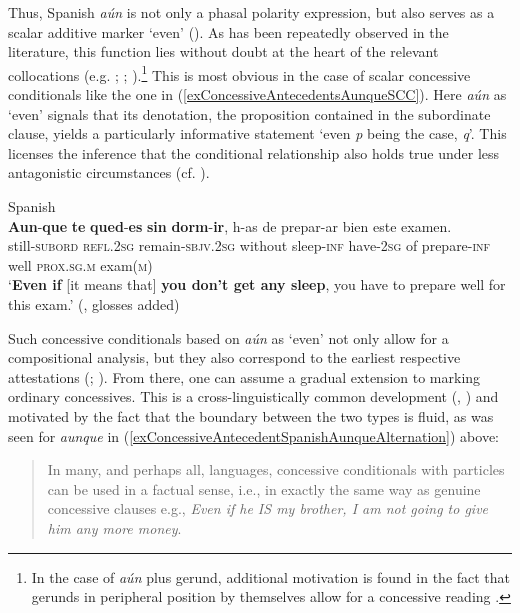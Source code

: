 Thus, Spanish \textit{aún} is not only a phasal polarity expression, but also serves as a scalar additive marker \lq even\rq{ }(). As has been repeatedly observed in the literature, this function lies without doubt at the heart of the relevant collocations (e.g. \cite{Elvira2005}; \cite{PerezSaldanyaVincent2014}; \cite{RAEGramatica}).\footnote{In the case of \textit{aún} plus gerund, additional motivation is found in the fact that gerunds in peripheral position by themselves allow for a concessive reading \parencite[§27.5g]{RAEGramatica}.} This is most obvious in the case of scalar concessive conditionals like the one in (\ref{exConcessiveAntecedentsAunqueSCC}). Here \textit{aún} as \lq even\rq{} signals that its  denotation, the proposition contained in the subordinate clause, yields a particularly informative statement \lq even \textit{p} being the case, \textit{q}\rq{}. This licenses the inference that the conditional relationship also holds true under less antagonistic circumstances (cf. \cite[80]{Koenig1991}).

\begin{exe}
	\ex Spanish\label{exConcessiveAntecedentsAunqueSCC}\\
	\gll \textbf{Aun}-\textbf{que} \textbf{te} \textbf{qued}-\textbf{es} \textbf{sin} \textbf{dorm}-\textbf{ir}, h-as de prepar-ar bien este examen.\\
still-\textsc{subord} \textsc{refl}.2\textsc{sg} remain-\textsc{sbjv}.2\textsc{sg} without sleep-\textsc{inf} have-2\textsc{sg} of prepare-\textsc{inf} well \textsc{prox}.\textsc{sg}.\textsc{m} exam(\textsc{m})\\
	\glt \lq \textbf{Even if} [it means that] \textbf{you don't get any sleep}, you have to prepare well for this exam.' (\cite[§47.12e]{RAEGramatica}, glosses added)
\end{exe}

Such concessive conditionals based on \textit{aún} as \lq even\rq{ }not only allow for a compositional analysis, but they also correspond to the earliest respective attestations (\cite{Elvira2005}; \cite{PerezSaldanyaVincent2014}). From there, one can assume a gradual extension to marking ordinary concessives. This is a cross-linguistically common development (\cite[82]{Koenig1991}, \citeyear{KoenigConcessives}) and motivated by the fact that the boundary between the two types is fluid, as was seen for \textit{aunque} in (\ref{exConcessiveAntecedentSpanishAunqueAlternation}) above:
\begin{quote}
In many, and perhaps all, languages, concessive conditionals with  particles can be used in a factual sense, i.e., in exactly the same way as genuine concessive clauses e.g.,  \textit{Even if he IS my brother, I am not going to give him any more money}. \parencite[822]{KoenigConcessives}
\end{quote}

